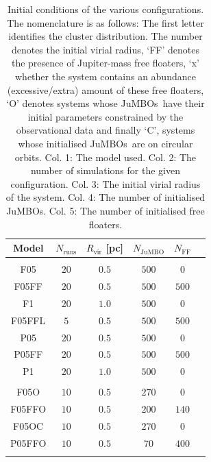 \documentclass[aa]{lib/aa}
\newcommand{\jumbos}{\mbox{JuMBOs}}
\begin{document}
\begin{table}
       \caption{Initial conditions of the various configurations. The nomenclature is as follows: The first letter identifies the cluster distribution. The number denotes the initial virial radius, `FF' denotes the presence of Jupiter-mass free floaters, `x' whether the system contains an abundance (excessive/extra) amount of these free floaters, `O' denotes systems whose \jumbos\, have their initial parameters constrained by the observational data and finally `C', systems whose initialised \jumbos\, are on circular orbits. Col.  1: The model used. Col.  2: The number of simulations for the given configuration. Col.  3: The initial virial radius of the system. Col.  4: The number of initialised JuMBOs. Col.  5: The number of initialised free floaters.}
        \label{Tab:SF_FF_Params}
        \centering 
        \begin{tabular}{c c c c c c}
        \hline\hline
        Model & $N_{\mathrm{runs}}$ & $R_{\mathrm{vir}}$ [pc] & $N_{\mathrm{JuMBO}}$ & $N_{\mathrm{FF}}$\\
        \hline \vspace{-0.75em}\\ 
           F05     & $20$ & $0.5$ & $500$ & $0$   \\
           F05FF   & $20$ & $0.5$ & $500$ & $500$ \\
           F1      & $20$ & $1.0$ & $500$ & $0$   \\
           F05FFL  & $5$  & $0.5$ & $500$ & $500$ \\
           P05     & $20$ & $0.5$ & $500$ & $0$   \\
           P05FF   & $20$ & $0.5$ & $500$ & $500$ \\
           P1      & $20$ & $1.0$ & $500$ & $0$   \\
           \hline \vspace{-0.75em}\\
           F05O    & $10$ & $0.5$ & $270$ & $0$   \\
           F05FFO  & $10$ & $0.5$ & $200$ & $140$ \\
           F05OC   & $10$ & $0.5$ & $270$ & $0$   \\
           P05FFO  & $10$ & $0.5$ & $70$ & $400$  \\
           \hline
         \hline                                   %
         \label{Tab:ISF_FFC_Initial}
        \end{tabular}
     \end{table}
\end{document}
